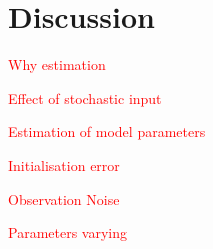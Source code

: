 \documentclass[10pt]{article}%
\newcommand\red{\textcolor{red}}
\begin{document}
\section{Discussion}

\red{Why estimation}

\red{Effect of stochastic input}

\red{Estimation of model parameters}

\red{Initialisation error}

\red{Observation Noise}

\red{Parameters varying}

% 
% 
% 
% 
% 
% 



\end{document}
